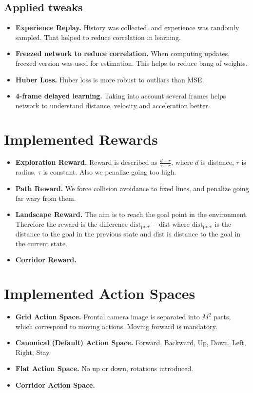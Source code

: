 \documentclass{article}
\begin{document}
\subsection{Applied tweaks}

\begin{itemize}
    \item {\bf Experience Replay.} History was collected, and experience was randomly sampled. That helped to reduce correlation in learning.
    \item {\bf Freezed network to reduce correlation.} When computing updates, freezed version was used for estimation. This helps
        to reduce bang of weights.
    \item {\bf Huber Loss.} Huber loss is more robust
        to outliars than MSE.
    \item {\bf 4-frame delayed learning.}
        Taking into account several frames helps network to understand
        distance, velocity and acceleration better.
\end{itemize}

\section{Implemented Rewards}

\begin{itemize}
    \item {\bf Exploration Reward.} Reward is described as $\frac{d - r}{\tau - r}$, where $d$ is distance, $r$ is radius, $\tau$ is constant.
        Also we penalize going too high.
    \item {\bf Path Reward.} We force collision avoidance to fixed lines, and penalize going far wary from them.
    \item {\bf Landscape Reward.} The aim is to reach the goal point in the environment. Therefore the reward is the difference $\text{dist}_{\text{prev}} - \text{dist}$ where $\text{dist}_{\text{prev}}$ is the distance to the goal in the previous state and $\text{dist}$ is distance to the goal in the current state. 
    \item {\bf Corridor Reward.}
\end{itemize}

\section{Implemented Action Spaces}

\begin{itemize}
    \item {\bf Grid Action Space.} Frontal camera image is separated into $M^2$ parts, which correspond to moving actions. Moving forward is
        mandatory.
    \item {\bf Canonical (Default) Action Space.} Forward, Backward, Up, Down, Left, Right, Stay.
    \item {\bf Flat Action Space.} No up or down, rotations introduced.
    \item {\bf Corridor Action Space.}
\end{itemize}
\end{document}
